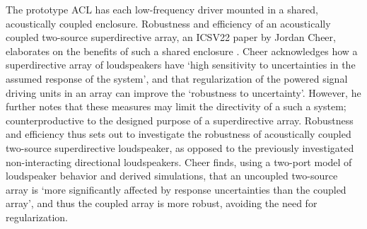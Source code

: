 \documentclass{report}
\begin{document}
        The prototype ACL has each low-frequency driver mounted in a shared, acoustically coupled enclosure.
        Robustness and efficiency of an acoustically coupled two-source superdirective array, an ICSV22 paper by Jordan Cheer, elaborates on the benefits of such a shared enclosure \cite{cheer2015robustness}.
        Cheer acknowledges how a superdirective array of loudspeakers have `high sensitivity to uncertainties in the assumed response of the system', and that regularization of the powered signal driving units in an array can improve the `robustness to uncertainty'.
        However, he further notes that these measures may limit the directivity of a such a system; counterproductive to the designed purpose of a superdirective array.
        Robustness and efficiency thus sets out to investigate the robustness of acoustically coupled two-source superdirective loudspeaker, as opposed to the previously investigated non-interacting directional loudspeakers.
        Cheer finds, using a two-port model of loudspeaker behavior and derived simulations, that an uncoupled two-source array is `more significantly affected by response uncertainties than the coupled array', and thus the coupled array is more robust, avoiding the need for regularization.
    
\end{document}
